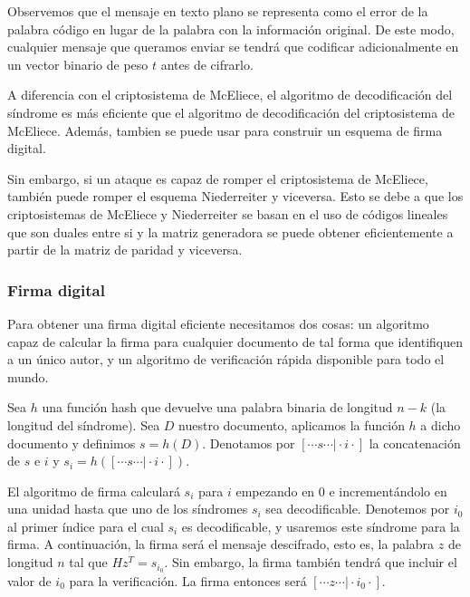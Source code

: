 Observemos que el mensaje en texto plano se representa como el error de la palabra código en lugar de la palabra con la información original. De este modo, cualquier mensaje que queramos enviar se tendrá que codificar adicionalmente en un vector binario de peso $t$ antes de cifrarlo.

A diferencia con el criptosistema de McEliece, el algoritmo de decodificación del síndrome es más eficiente que el algoritmo de decodificación del criptosistema de McEliece. Además, tambien se puede usar para construir un esquema de firma digital.

Sin embargo, si un ataque es capaz de romper el criptosistema de McEliece, también puede romper el esquema Niederreiter y viceversa. Esto se debe a que los criptosistemas de McEliece y Niederreiter se basan en el uso de códigos lineales que son duales entre si y la matriz generadora se puede obtener eficientemente a partir de la matriz de paridad y viceversa.



\subsubsection{Firma digital}

Para obtener una firma digital eficiente necesitamos dos cosas: un algoritmo capaz de calcular la firma para cualquier documento de tal forma que identifiquen a un único autor, y un algoritmo de verificación rápida disponible para todo el mundo.

Sea $h$ una función hash que devuelve una palabra binaria de longitud $n - k$ (la longitud del síndrome). Sea $D$ nuestro documento, aplicamos la función $h$ a dicho documento y definimos $s = h(D)$. Denotamos por $[ \cdots s \cdots \vert \cdot i \cdot]$ la concatenación de $s$ e $i$ y $s_i = h([ \cdots s \cdots \vert \cdot i \cdot])$.

El algoritmo de firma calculará $s_i$ para $i$ empezando en $0$ e incrementándolo en una unidad hasta que uno de los síndromes $s_i$ sea decodificable. Denotemos por $i_0$ al primer índice para el cual $s_i$ es decodificable, y usaremos este síndrome para la firma. A continuación, la firma será el mensaje descifrado, esto es, la palabra $z$ de longitud $n$ tal que $Hz^T = s_{i_0}$. Sin embargo, la firma también tendrá que incluir el valor de $i_0$ para la verificación. La firma entonces será $[\cdots z \cdots \vert \cdot i_0 \cdot]$.

